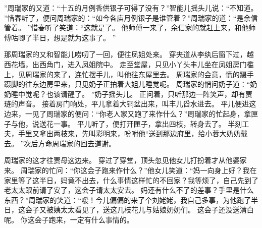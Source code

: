 ”周瑞家的又道：“十五的月例香供银子可得了没有？”智能儿摇头儿说：“不知道。
”惜春听了，便问周瑞家的：“如今各庙月例银子是谁管着？”周瑞家的道：“是余信
管着。
”惜春听了笑道：“这就是了。
他师傅一来了，余信家的就赶上来，和他师傅咕唧了半日，想是就为这事了。
”\par
那周瑞家的又和智能儿唠叨了一回，便往凤姐处来。
穿夹道从李纨后窗下过，越西花墙，出西角门，进入凤姐院中。
走至堂屋，只见小丫头丰儿坐在凤姐房门槛上，见周瑞家的来了，连忙摆手儿，叫他往东屋里去。
周瑞家的会意，慌的蹑手蹑脚的往东边房里来，只见奶子正拍着大姐儿睡觉呢。
周瑞家的悄问奶子道：“奶奶睡中觉呢？也该请醒了。
”奶子摇头儿。
正问着，只听那边一阵笑声，却有贾琏的声音。
接着房门响处，平儿拿着大铜盆出来，叫丰儿舀水进去。
平儿便进这边来，一见了周瑞家的便问：“你老人家又跑了来作什么？”周瑞家的忙起身，拿匣子与他，说送花一事。
平儿听了，便打开匣子，拿出四枝，转身去了。
半刻工夫，手里又拿出两枝来，先叫彩明来，吩咐他“送到那边府里，给小蓉大奶奶戴去。
”次后方命周瑞家的回去道谢。
\par
周瑞家的这才往贾母这边来。
穿过了穿堂，顶头忽见他女儿打扮着才从他婆家来。
周瑞家的忙问：“你这会子跑来作什么？”他女儿笑道：“妈一向身上好？我在家里等了这半日，妈竟不出去，什么事情这样忙的不回家？我等烦了，自己先到了老太太跟前请了安了，这会子请太太安去。
妈还有什么不了的差事？手里是什么东西？”周瑞家的笑道：“嗳！今儿偏偏的来了个刘姥姥，我自己多事，为他跑了半日，这会子又被姨太太看见了，送这几枝花儿与姑娘奶奶们。
这会子还没送清白呢。
你这会子跑来，一定有什么事情的。

